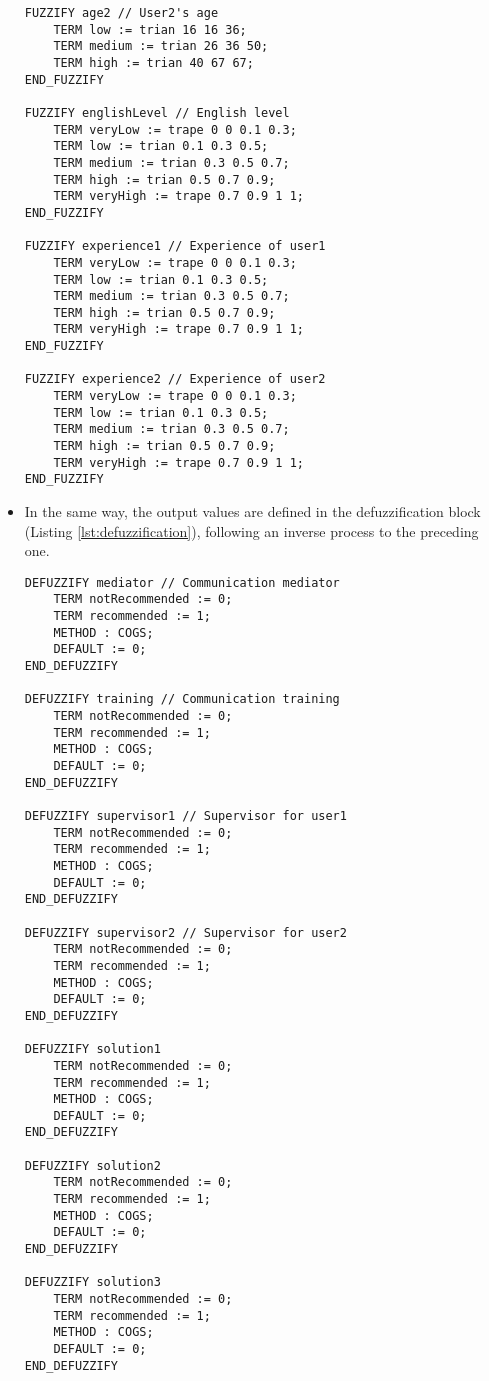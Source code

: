 \begin{itemize}
\begin{lstlisting}[caption={[Fuzzification block]Fuzzification block}, label=lst:fuzzification]
FUZZIFY age2 // User2's age
	TERM low := trian 16 16 36;
	TERM medium := trian 26 36 50;
	TERM high := trian 40 67 67;
END_FUZZIFY

FUZZIFY englishLevel // English level
	TERM veryLow := trape 0 0 0.1 0.3;
	TERM low := trian 0.1 0.3 0.5;
	TERM medium := trian 0.3 0.5 0.7;
	TERM high := trian 0.5 0.7 0.9;
	TERM veryHigh := trape 0.7 0.9 1 1;
END_FUZZIFY

FUZZIFY experience1 // Experience of user1
	TERM veryLow := trape 0 0 0.1 0.3;
	TERM low := trian 0.1 0.3 0.5;
	TERM medium := trian 0.3 0.5 0.7;
	TERM high := trian 0.5 0.7 0.9;
	TERM veryHigh := trape 0.7 0.9 1 1;
END_FUZZIFY

FUZZIFY experience2 // Experience of user2
	TERM veryLow := trape 0 0 0.1 0.3;
	TERM low := trian 0.1 0.3 0.5;
	TERM medium := trian 0.3 0.5 0.7;
	TERM high := trian 0.5 0.7 0.9;
	TERM veryHigh := trape 0.7 0.9 1 1;
END_FUZZIFY
\end{lstlisting}

\vspace{16px}
\item In the same way, the output values are defined in the defuzzification block (Listing \ref{lst:defuzzification}), following an inverse process to the preceding one.
\newpage
\begin{lstlisting}[caption={[Defuzzification block]Defuzzification block}, label=lst:defuzzification]
DEFUZZIFY mediator // Communication mediator
	TERM notRecommended := 0;
	TERM recommended := 1;
	METHOD : COGS;
	DEFAULT := 0;
END_DEFUZZIFY

DEFUZZIFY training // Communication training
	TERM notRecommended := 0;
	TERM recommended := 1;
	METHOD : COGS;
	DEFAULT := 0;
END_DEFUZZIFY

DEFUZZIFY supervisor1 // Supervisor for user1
	TERM notRecommended := 0;
	TERM recommended := 1;
	METHOD : COGS;
	DEFAULT := 0;
END_DEFUZZIFY

DEFUZZIFY supervisor2 // Supervisor for user2
	TERM notRecommended := 0;
	TERM recommended := 1;
	METHOD : COGS;
	DEFAULT := 0;
END_DEFUZZIFY

DEFUZZIFY solution1
	TERM notRecommended := 0;
	TERM recommended := 1;
	METHOD : COGS;
	DEFAULT := 0;
END_DEFUZZIFY

DEFUZZIFY solution2
	TERM notRecommended := 0;
	TERM recommended := 1;
	METHOD : COGS;
	DEFAULT := 0;
END_DEFUZZIFY

DEFUZZIFY solution3
	TERM notRecommended := 0;
	TERM recommended := 1;
	METHOD : COGS;
	DEFAULT := 0;
END_DEFUZZIFY


\end{lstlisting}
\end{itemize}
